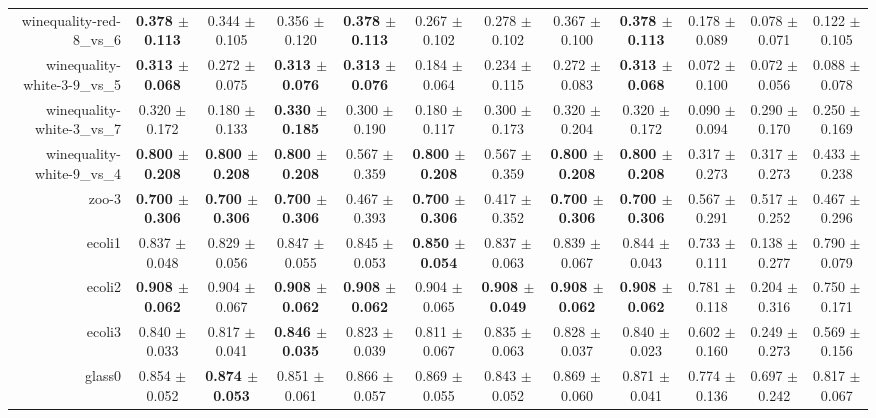 \begin{table}[!ht]
{\begin{tabular}{r c c c c c c c c c c c}
winequality-red-8\_vs\_6 & \textbf{0.378 $\pm$ 0.113} & 0.344 $\pm$ 0.105 & 0.356 $\pm$ 0.120 & \textbf{0.378 $\pm$ 0.113} & 0.267 $\pm$ 0.102 & 0.278 $\pm$ 0.102 & 0.367 $\pm$ 0.100 & \textbf{0.378 $\pm$ 0.113} & 0.178 $\pm$ 0.089 & 0.078 $\pm$ 0.071 & 0.122 $\pm$ 0.105 \\
winequality-white-3-9\_vs\_5 & \textbf{0.313 $\pm$ 0.068} & 0.272 $\pm$ 0.075 & \textbf{0.313 $\pm$ 0.076} & \textbf{0.313 $\pm$ 0.076} & 0.184 $\pm$ 0.064 & 0.234 $\pm$ 0.115 & 0.272 $\pm$ 0.083 & \textbf{0.313 $\pm$ 0.068} & 0.072 $\pm$ 0.100 & 0.072 $\pm$ 0.056 & 0.088 $\pm$ 0.078 \\
winequality-white-3\_vs\_7 & 0.320 $\pm$ 0.172 & 0.180 $\pm$ 0.133 & \textbf{0.330 $\pm$ 0.185} & 0.300 $\pm$ 0.190 & 0.180 $\pm$ 0.117 & 0.300 $\pm$ 0.173 & 0.320 $\pm$ 0.204 & 0.320 $\pm$ 0.172 & 0.090 $\pm$ 0.094 & 0.290 $\pm$ 0.170 & 0.250 $\pm$ 0.169 \\
winequality-white-9\_vs\_4 & \textbf{0.800 $\pm$ 0.208} & \textbf{0.800 $\pm$ 0.208} & \textbf{0.800 $\pm$ 0.208} & 0.567 $\pm$ 0.359 & \textbf{0.800 $\pm$ 0.208} & 0.567 $\pm$ 0.359 & \textbf{0.800 $\pm$ 0.208} & \textbf{0.800 $\pm$ 0.208} & 0.317 $\pm$ 0.273 & 0.317 $\pm$ 0.273 & 0.433 $\pm$ 0.238 \\
zoo-3 & \textbf{0.700 $\pm$ 0.306} & \textbf{0.700 $\pm$ 0.306} & \textbf{0.700 $\pm$ 0.306} & 0.467 $\pm$ 0.393 & \textbf{0.700 $\pm$ 0.306} & 0.417 $\pm$ 0.352 & \textbf{0.700 $\pm$ 0.306} & \textbf{0.700 $\pm$ 0.306} & 0.567 $\pm$ 0.291 & 0.517 $\pm$ 0.252 & 0.467 $\pm$ 0.296 \\
ecoli1 & 0.837 $\pm$ 0.048 & 0.829 $\pm$ 0.056 & 0.847 $\pm$ 0.055 & 0.845 $\pm$ 0.053 & \textbf{0.850 $\pm$ 0.054} & 0.837 $\pm$ 0.063 & 0.839 $\pm$ 0.067 & 0.844 $\pm$ 0.043 & 0.733 $\pm$ 0.111 & 0.138 $\pm$ 0.277 & 0.790 $\pm$ 0.079 \\
ecoli2 & \textbf{0.908 $\pm$ 0.062} & 0.904 $\pm$ 0.067 & \textbf{0.908 $\pm$ 0.062} & \textbf{0.908 $\pm$ 0.062} & 0.904 $\pm$ 0.065 & \textbf{0.908 $\pm$ 0.049} & \textbf{0.908 $\pm$ 0.062} & \textbf{0.908 $\pm$ 0.062} & 0.781 $\pm$ 0.118 & 0.204 $\pm$ 0.316 & 0.750 $\pm$ 0.171 \\
ecoli3 & 0.840 $\pm$ 0.033 & 0.817 $\pm$ 0.041 & \textbf{0.846 $\pm$ 0.035} & 0.823 $\pm$ 0.039 & 0.811 $\pm$ 0.067 & 0.835 $\pm$ 0.063 & 0.828 $\pm$ 0.037 & 0.840 $\pm$ 0.023 & 0.602 $\pm$ 0.160 & 0.249 $\pm$ 0.273 & 0.569 $\pm$ 0.156 \\
glass0 & 0.854 $\pm$ 0.052 & \textbf{0.874 $\pm$ 0.053} & 0.851 $\pm$ 0.061 & 0.866 $\pm$ 0.057 & 0.869 $\pm$ 0.055 & 0.843 $\pm$ 0.052 & 0.869 $\pm$ 0.060 & 0.871 $\pm$ 0.041 & 0.774 $\pm$ 0.136 & 0.697 $\pm$ 0.242 & 0.817 $\pm$ 0.067 \\

\end{tabular}}
\end{table}
